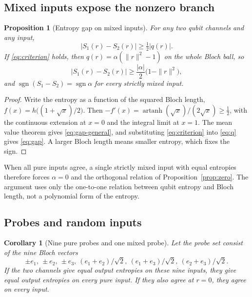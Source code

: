 \documentclass[12pt,a4paper]{article}
\newtheorem{proposition}[theorem]{Proposition}
\newtheorem{corollary}[theorem]{Corollary}
\begin{document}
\subsection{Mixed inputs expose the nonzero branch}

\begin{proposition}[Entropy gap on mixed inputs]
\label{prop:gap}
For any two qubit channels and any input,
\begin{equation}
|S_1(r)-S_2(r)|\ge\tfrac12|q(r)| .
\label{eq:gap-general}
\end{equation}
If \eqref{eq:criterion} holds, then $q(r)=\alpha(\|r\|^2-1)$ on the whole Bloch ball, so
\begin{equation}
|S_1(r)-S_2(r)|\ge\frac{|\alpha|}{2}\bigl(1-\|r\|^2\bigr),
\label{eq:gap}
\end{equation}
and $\operatorname{sgn}(S_1-S_2)=\operatorname{sgn}\alpha$ for every strictly mixed input.
\end{proposition}

\begin{proof}
Write the entropy as a function of the squared Bloch length, $f(x)=h\bigl((1+\sqrt x)/2\bigr)$. Then $-f'(x)=\operatorname{artanh}(\sqrt x)/(2\sqrt x)\ge\tfrac12$, with the continuous extension at $x=0$ and the integral limit at $x=1$. The mean value theorem gives \eqref{eq:gap-general}, and substituting \eqref{eq:criterion} into \eqref{eq:q} gives \eqref{eq:gap}. A larger Bloch length means smaller entropy, which fixes the sign.
\end{proof}

When all pure inputs agree, a single strictly mixed input with equal entropies therefore forces $\alpha=0$ and the orthogonal relation of Proposition~\ref{prop:zero}. The argument uses only the one-to-one relation between qubit entropy and Bloch length, not a polynomial form of the entropy.

\subsection{Probes and random inputs}

\begin{corollary}[Nine pure probes and one mixed probe]
\label{cor:probes}
Let the probe set consist of the nine Bloch vectors
\[
\pm e_1,\ \pm e_2,\ \pm e_3,\ (e_1+e_2)/\sqrt2,\ (e_1+e_3)/\sqrt2,\ (e_2+e_3)/\sqrt2 .
\]
If the two channels give equal output entropies on these nine inputs, they give equal output entropies on every pure input. If they also agree at $r=0$, they agree on every input.
\end{corollary}
\end{document}
